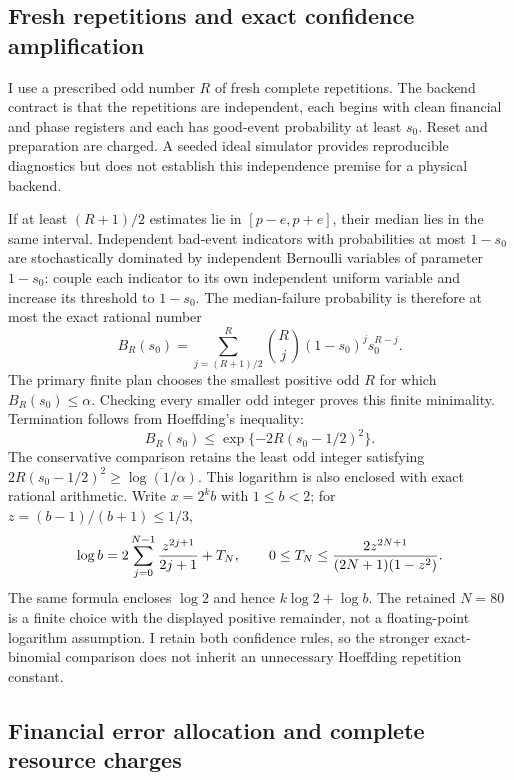 \subsection{Fresh repetitions and exact confidence amplification}

I use a prescribed odd number $R$ of fresh complete repetitions. The
backend contract is that the repetitions are independent, each begins with
clean financial and phase registers and each has good-event probability
at least $s_0$. Reset and preparation are charged. A seeded ideal simulator
provides reproducible diagnostics but does not establish this independence
premise for a physical backend.

If at least $(R+1)/2$ estimates lie in $[p-e,p+e]$, their median lies in
the same interval. Independent bad-event indicators with probabilities at
most $1-s_0$ are stochastically dominated by independent Bernoulli variables
of parameter $1-s_0$: couple each indicator to its own independent uniform
variable and increase its threshold to $1-s_0$. The median-failure
probability is therefore at most the exact rational number
\begin{equation}
 B_R(s_0)=\sum_{j=(R+1)/2}^{R}{R\choose j}
       (1-s_0)^j s_0^{R-j}.
 \label{eq:qpe-exact-binomial-confidence}
\end{equation}
The primary finite plan chooses the smallest positive odd $R$ for which
$B_R(s_0)\leq\alpha$. Checking every smaller odd integer proves this finite minimality.
Termination follows from Hoeffding's inequality:
\[
 B_R(s_0)\leq\exp\{-2R(s_0-1/2)^2\}.
\]
The conservative comparison retains the least odd integer satisfying
$2R(s_0-1/2)^2\geq\overline{\log(1/\alpha)}$. This logarithm is also
enclosed with exact rational arithmetic. Write $x=2^k b$ with $1\leq b<2$;
for $z=(b-1)/(b+1)\leq1/3$,
\[
 \log b=2\sum_{j=0}^{N-1}{z^{2j+1}\over2j+1}+T_N,
 \qquad0\leq T_N\leq
 {2z^{2N+1}\over(2N+1)(1-z^2)}.
\]
The same formula encloses $\log2$ and hence $k\log2+\log b$. The retained
$N=80$ is a finite choice with the displayed positive remainder, not a
floating-point logarithm assumption. I retain both confidence rules, so the
stronger exact-binomial comparison does not inherit an unnecessary
Hoeffding repetition constant.

\subsection{Financial error allocation and complete resource charges}

